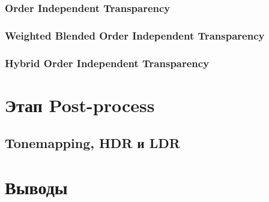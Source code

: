 		\subsubsection{Order Independent Transparency} \label{ch3:render_pass:transparents:oit}
		\subsubsection{Weighted Blended Order Independent Transparency} \label{ch3:render_pass:transparents:wboit}
		\subsubsection{Hybrid Order Independent Transparency} \label{ch3:render_pass:transparents:hybrid_oit}
		
\section{Этап Post-process} \label{ch3:post_process}
	\subsection{Tonemapping, HDR и LDR} \label{ch3:post_process:hdr_ldr_tonemapping}
\section{Выводы} \label{ch3:conclusion}

%
